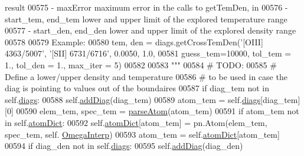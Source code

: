 \begin{DoxyCode}
{{{{       result}
00575 \textcolor{stringliteral}{        - maxError   maximum error in the calls to getTemDen, in %
00576 \textcolor{stringliteral}{        - start\_tem, end\_tem  lower and upper limit of the explored temperature range }
00577 \textcolor{stringliteral}{        - start\_den, end\_den  lower and upper limit of the explored density range }
00578 \textcolor{stringliteral}{    }
00579 \textcolor{stringliteral}{        Example:}
00580 \textcolor{stringliteral}{            tem, den = diags.getCrossTemDen('[OIII] 4363/5007', '[SII] 6731/6716', 0.0050, 1.0, }
00581 \textcolor{stringliteral}{                        guess\_tem=10000, tol\_tem = 1., tol\_den = 1., max\_iter = 5)}
00582 \textcolor{stringliteral}{}
00583 \textcolor{stringliteral}{        """}
00584         \textcolor{comment}{# TODO:}
00585         \textcolor{comment}{# Define a lower/upper density and temperature }
00586         \textcolor{comment}{# to be used in case the diag is pointing to values out of the boundaires}
00587         \textcolor{keywordflow}{if} diag\_tem \textcolor{keywordflow}{not} \textcolor{keywordflow}{in} self.\hyperlink{classpyneb_1_1core_1_1diags_1_1_diagnostics_a0c0f7e36097677f61a6a14a0c3127b02}{diags}:
00588             self.\hyperlink{classpyneb_1_1core_1_1diags_1_1_diagnostics_a508fa9c5a2216f9eb4128338c33a6f75}{addDiag}(diag\_tem)
00589         atom\_tem = self.\hyperlink{classpyneb_1_1core_1_1diags_1_1_diagnostics_a0c0f7e36097677f61a6a14a0c3127b02}{diags}[diag\_tem][0]
00590         elem\_tem, spec\_tem = \hyperlink{namespacepyneb_1_1utils_1_1misc_a8c069186002a3e73dd474958e35034d5}{parseAtom}(atom\_tem)
00591         \textcolor{keywordflow}{if} atom\_tem \textcolor{keywordflow}{not} \textcolor{keywordflow}{in} self.\hyperlink{classpyneb_1_1core_1_1diags_1_1_diagnostics_a36301f268745b33abe6cfeb3e41a6356}{atomDict}:
00592             self.\hyperlink{classpyneb_1_1core_1_1diags_1_1_diagnostics_a36301f268745b33abe6cfeb3e41a6356}{atomDict}[atom\_tem] = pn.Atom(elem\_tem, spec\_tem, self.
      \hyperlink{classpyneb_1_1core_1_1diags_1_1_diagnostics_acfd0638b293790832bcee3cd9f3ec342}{OmegaInterp})
00593         atom\_tem = self.\hyperlink{classpyneb_1_1core_1_1diags_1_1_diagnostics_a36301f268745b33abe6cfeb3e41a6356}{atomDict}[atom\_tem]
00594         \textcolor{keywordflow}{if} diag\_den \textcolor{keywordflow}{not} \textcolor{keywordflow}{in} self.\hyperlink{classpyneb_1_1core_1_1diags_1_1_diagnostics_a0c0f7e36097677f61a6a14a0c3127b02}{diags}:
00595             self.\hyperlink{classpyneb_1_1core_1_1diags_1_1_diagnostics_a508fa9c5a2216f9eb4128338c33a6f75}{addDiag}(diag\_den)
}}}}
\end{DoxyCode}
